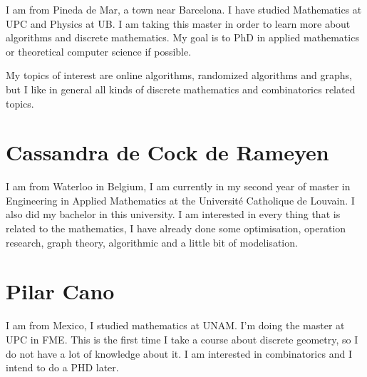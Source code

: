 \documentclass[11pt]{amsart}
\begin{document}
I am from Pineda de Mar, a town near Barcelona. I have studied Mathematics at UPC and Physics at UB. 
I am taking this master in order to learn more about algorithms and discrete mathematics.
My goal is to PhD in applied mathematics or theoretical computer science if possible.

My topics of interest are online algorithms, randomized algorithms and graphs,
but I like in general all kinds of discrete mathematics and combinatorics related topics.

\section*{Cassandra de Cock de Rameyen}
I am from Waterloo in Belgium, I am currently in my second year of master in Engineering in Applied Mathematics at the Université Catholique de Louvain. I also did my bachelor in this university. I am interested in every thing that is related to the mathematics, I have already done some optimisation, operation research, graph theory, algorithmic and a little bit of modelisation.


\section*{Pilar Cano}
I am from Mexico, I studied mathematics at UNAM. I'm doing the master at UPC in FME. 
This is the first time I take a course about discrete geometry, so I do not have a lot of knowledge about it. 
I am interested in combinatorics and I intend to do a PHD later.
\end{document}
